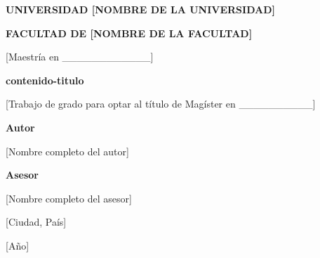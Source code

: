 \documentclass[letterpaper,12pt]{article}   %
\begin{document}
\begin{titlepage}
    \centering
    \thispagestyle{empty}
    \singlespacing
    \vspace*{1cm}

    {\bfseries UNIVERSIDAD [NOMBRE DE LA UNIVERSIDAD]\par}
    {\bfseries FACULTAD DE [NOMBRE DE LA FACULTAD]\par}
    {[Maestría en \_\_\_\_\_\_\_\_\_\_\_\_]\par}

    \vfill

    {\LARGE\bfseries contenido-titulo\par}

    \vspace{1cm}
    {[Trabajo de grado para optar al título de Magíster en \_\_\_\_\_\_\_\_\_\_]\par}

    \vfill

    {\bfseries Autor\par}
    {[Nombre completo del autor]\par}

    \vspace{0.8cm}
    {\bfseries Asesor\par}
    {[Nombre completo del asesor]\par}

    \vfill

    {[Ciudad, País]\par}
    {[Año]\par}
\end{titlepage}

%   
%   
%   
    \tableofcontents
    \newpage

\clearpage
{}
\end{document}
